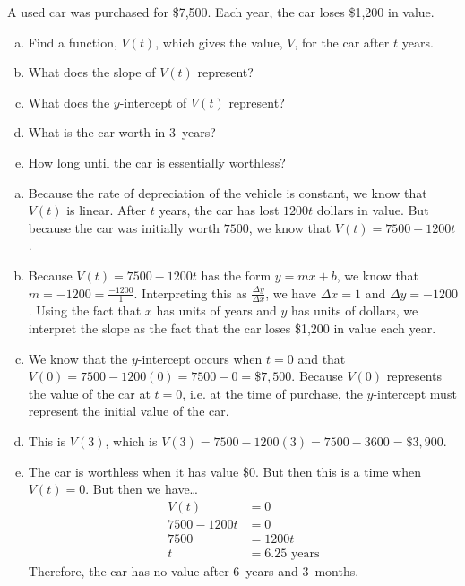 \documentclass[11pt,letterpaper]{article}
\begin{document}
\newpage



 A used car was purchased for \$7,500. Each year, the car loses \$1,200 in value.
        \begin{enumerate}[(a)]
        \item Find a function, $V(t)$, which gives the value, $V$, for the car after $t$ years.
        \item What does the slope of $V(t)$ represent?
        \item What does the $y$-intercept of $V(t)$ represent?
        \item What is the car worth in 3~years?
        \item How long until the car is essentially worthless? 
        \end{enumerate} \pspace

\sol
\begin{enumerate}[(a)]
\item Because the rate of depreciation of the vehicle is constant, we know that $V(t)$ is linear. After $t$ years, the car has lost $1200t$ dollars in value. But because the car was initially worth $7500$, we know that $V(t)= 7500 - 1200t$. \pspace

\item Because $V(t)= 7500 - 1200t$ has the form $y= mx + b$, we know that $m= -1200= \frac{-1200}{1}$. Interpreting this as $\frac{\Delta y}{\Delta x}$, we have $\Delta x= 1$ and $\Delta y= -1200$. Using the fact that $x$ has units of years and $y$ has units of dollars, we interpret the slope as the fact that the car loses \$1,200 in value each year. \pspace

\item We know that the $y$-intercept occurs when $t= 0$ and that $V(0)= 7500 - 1200(0)= 7500 - 0= \$7,500$. Because $V(0)$ represents the value of the car at $t= 0$, i.e. at the time of purchase, the $y$-intercept must represent the initial value of the car. \pspace

\item This is $V(3)$, which is $V(3)= 7500 - 1200(3)= 7500 - 3600= \$3,900$. \pspace

\item The car is worthless when it has value \$0. But then this is a time when $V(t)= 0$. But then we have\dots
	\[
	\begin{aligned}
	V(t)&= 0 \\[0.3cm]
	7500 - 1200t&= 0 \\[0.3cm]
	7500&= 1200t \\[0.3cm]
	t&= 6.25 \text{ years}
	\end{aligned}
	\]
Therefore, the car has no value after 6~years and 3~months. 
\end{enumerate}
\end{document}
